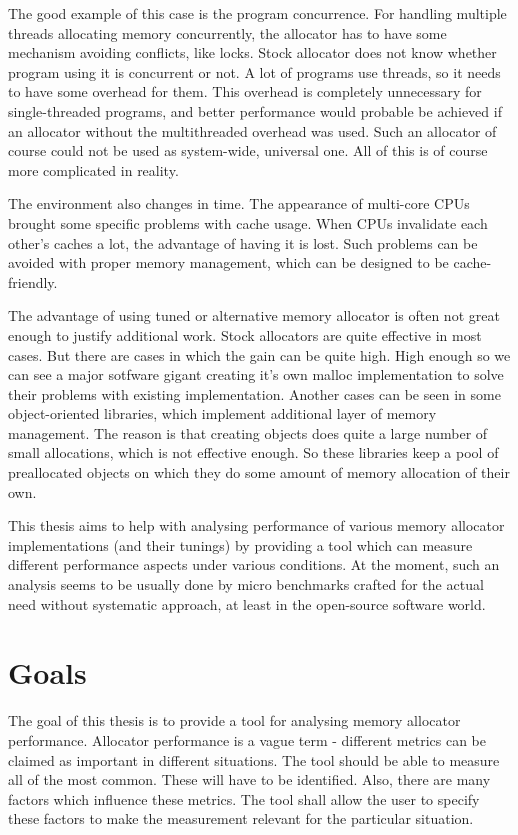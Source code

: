 The good example of this case is the program concurrence. For handling multiple threads allocating memory concurrently, the allocator has to have some mechanism avoiding conflicts, like locks. Stock allocator does not know whether program using it is concurrent or not. A lot of programs use threads, so it needs to have some overhead for them. This overhead is completely unnecessary for single-threaded programs, and better performance would probable be achieved if an allocator without the multithreaded overhead was used. Such an allocator of course could not be used as system-wide, universal one. All of this is of course more complicated in reality.

The environment also changes in time. The appearance of multi-core CPUs brought some specific problems with cache usage. When CPUs invalidate each other's caches a lot, the advantage of having it is lost. Such problems can be avoided with proper memory management, which can be designed to be cache-friendly.

The advantage of using tuned or alternative memory allocator is often not great enough to justify additional work. Stock allocators are quite effective in most cases. But there are cases in which the gain can be quite high. High enough so we can see a major sotfware gigant creating it's own malloc implementation to solve their problems with existing implementation. Another cases can be seen in some object-oriented libraries, which implement additional layer of memory management. The reason is that creating objects does quite a large number of small allocations, which is not effective enough. So these libraries keep a pool of preallocated objects on which they do some amount of memory allocation of their own.

This thesis aims to help with analysing performance of various memory allocator implementations (and their tunings) by providing a tool which can measure different performance aspects under various conditions. At the moment, such an analysis seems to be usually done by micro benchmarks crafted for the actual need without systematic approach, at least in the open-source software world.
\section{Goals}
The goal of this thesis is to provide a tool for analysing memory allocator performance. Allocator performance is a vague term - different metrics can be claimed as important in different situations. The tool should be able to measure all of the most common. These will have to be identified. Also, there are many factors which influence these metrics. The tool shall allow the user to specify these factors to make the measurement relevant for the particular situation.

